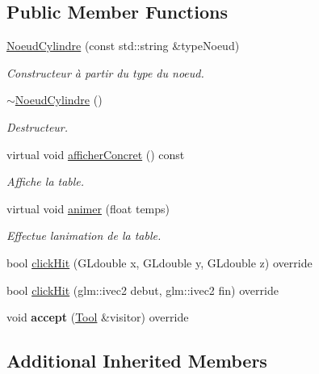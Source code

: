 \subsection*{Public Member Functions}
{\bf }\par
\begin{DoxyCompactItemize}
\item 
\hyperlink{class_noeud_cylindre_aee7f35b6d758ac40b96daadf526f4504}{Noeud\+Cylindre} (const std\+::string \&type\+Noeud)
\begin{DoxyCompactList}\small\item\em Constructeur à partir du type du noeud. \end{DoxyCompactList}\item 
\hyperlink{class_noeud_cylindre_aa08fe15b1f926c8d651fcd467d3cb36a}{$\sim$\+Noeud\+Cylindre} ()
\begin{DoxyCompactList}\small\item\em Destructeur. \end{DoxyCompactList}\item 
virtual void \hyperlink{class_noeud_cylindre_a24bd5b287091cdecdd250ebb83594551}{afficher\+Concret} () const 
\begin{DoxyCompactList}\small\item\em Affiche la table. \end{DoxyCompactList}\item 
virtual void \hyperlink{class_noeud_cylindre_a28f14db4ab1b6c64e964ea665791b786}{animer} (float temps)
\begin{DoxyCompactList}\small\item\em Effectue l\textquotesingle{}animation de la table. \end{DoxyCompactList}\item 
bool \hyperlink{class_noeud_cylindre_a6dd083ca619c9ff7977d3a0878732519}{click\+Hit} (G\+Ldouble x, G\+Ldouble y, G\+Ldouble z) override
\item 
bool \hyperlink{class_noeud_cylindre_a461dfbf53728711e290d14db7464f5f9}{click\+Hit} (glm\+::ivec2 debut, glm\+::ivec2 fin) override
\item 
\hypertarget{class_noeud_cylindre_a108b067e7817f5c83ca66643bb67769b}{}void {\bfseries accept} (\hyperlink{class_tool}{Tool} \&visitor) override\label{class_noeud_cylindre_a108b067e7817f5c83ca66643bb67769b}

\end{DoxyCompactItemize}

\subsection*{Additional Inherited Members}


